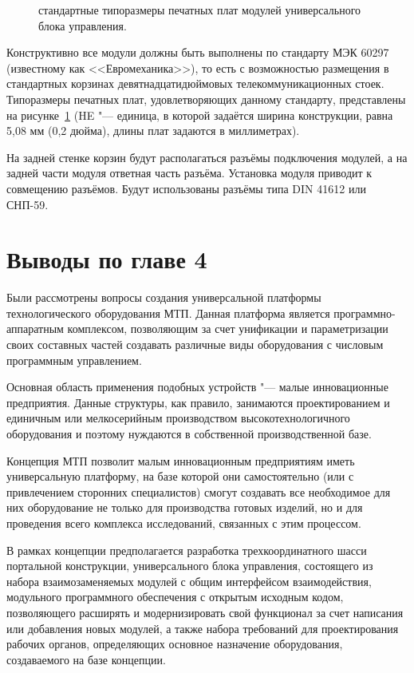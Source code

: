 \begin{figure}[ht]
	\caption{стандартные типоразмеры печатных плат модулей универсального блока управления.}\label{fig:euromech}
\end{figure}

Конструктивно все модули должны быть выполнены по стандарту МЭК 60297 (известному как <<Евромеханика>>), то есть с возможностью размещения в стандартных корзинах девятнадцатидюймовых телекоммуникационных стоек. Типоразмеры печатных плат, удовлетворяющих данному стандарту, представлены на рисунке~\cref{fig:euromech} (\foreignlanguage{english}{HE} "--- единица, в которой задаётся ширина конструкции, равна 5,08 мм (0,2 дюйма), длины плат задаются в миллиметрах).

На задней стенке корзин будут располагаться разъёмы подключения модулей, а на задней части модуля ответная часть разъёма. Установка модуля приводит к совмещению разъёмов. Будут использованы разъёмы типа DIN 41612 или СНП-59.


\section{Выводы по главе 4}

Были рассмотрены вопросы создания универсальной платформы технологического оборудования МТП. Данная платформа является программно-аппаратным комплексом, позволяющим за счет унификации и параметризации своих составных частей создавать различные виды оборудования с числовым программным управлением.

Основная область применения подобных устройств "--- малые инновационные предприятия. Данные структуры, как правило, занимаются проектированием и единичным или мелкосерийным производством высокотехнологичного оборудования и поэтому нуждаются в собственной производственной базе.

Концепция МТП позволит малым инновационным предприятиям иметь универсальную платформу, на базе которой они самостоятельно (или с привлечением сторонних специалистов) смогут создавать все необходимое для них оборудование не только для производства готовых изделий, но и для проведения всего комплекса исследований, связанных с этим процессом.

В рамках концепции предполагается разработка трехкоординатного шасси портальной конструкции, универсального блока управления, состоящего из набора взаимозаменяемых модулей с общим интерфейсом взаимодействия, модульного программного обеспечения с открытым исходным кодом, позволяющего расширять и модернизировать свой функционал за счет написания или добавления новых модулей, а также набора требований для проектирования рабочих органов, определяющих основное назначение оборудования, создаваемого на базе концепции.


\FloatBarrier


\FloatBarrier
